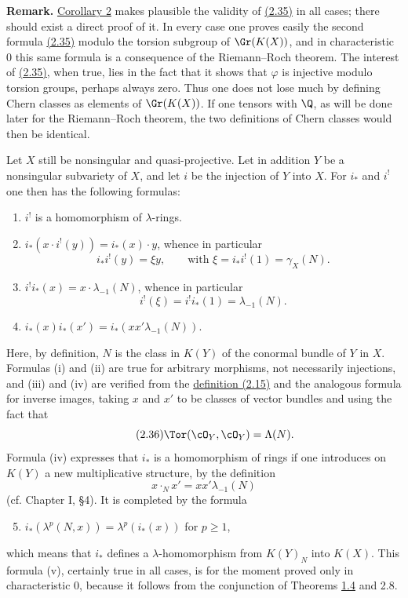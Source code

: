 \textbf{Remark.} \hyperlink{sga6.e00.cor.2}{Corollary 2} makes plausible the validity of \hyperlink{sga6.e00.eq.2-35}{(2.35)} in all cases; there should exist a direct proof of it. In every case one proves easily the second formula \hyperlink{sga6.e00.eq.2-35}{(2.35)} modulo the torsion subgroup of $\Gr(K(X))$, and in characteristic $0$ this same formula is a consequence of the Riemann--Roch theorem. The interest of \hyperlink{sga6.e00.eq.2-35}{(2.35)}, when true, lies in the fact that it shows that $\varphi$ is injective modulo torsion groups, perhaps always zero. Thus one does not lose much by defining Chern classes as elements of $\Gr(K(X))$. If one tensors with $\Q$, as will be done later for the Riemann--Roch theorem, the two definitions of Chern classes would then be identical.

Let $X$ still be nonsingular and quasi-projective. Let in addition $Y$ be a nonsingular subvariety of $X$, and let $i$ be the injection of $Y$ into $X$. For $i_*$ and $i^!$ one then has the following formulas:
\begin{enumerate}[label=(\roman*)]
\item $i^!$ is a homomorphism of $\lambda$-rings.
\item $i_*(x\cdot i^!(y))=i_*(x)\cdot y$, whence in particular
\[
 i_*i^!(y)=\xi y,
\qquad \text{with }\xi=i_*i^!(1)=\gamma_X(N).
\]
\item $i^!i_*(x)=x\cdot\lambda_{-1}(N)$, whence in particular
\[
 i^!(\xi)=i^!i_*(1)=\lambda_{-1}(N).
\]
\item $i_*(x)i_*(x')=i_*(xx'\lambda_{-1}(N))$.
\end{enumerate}
Here, by definition, $N$ is the class in $K(Y)$ of the conormal bundle of $Y$ in $X$. Formulas (i) and (ii) are true for arbitrary morphisms, not necessarily injections, and (iii) and (iv) are verified from the \hyperlink{sga6.e00.eq.2-15}{definition (2.15)} and the analogous formula for inverse images, taking $x$ and $x'$ to be classes of vector bundles and using the fact that
\begin{equation}\tag{2.36}
 \Tor(\cO_Y,\cO_Y)=\Lambda(N).
\end{equation}
Formula (iv) expresses that $i_*$ is a homomorphism of rings if one introduces on $K(Y)$ a new multiplicative structure, by the definition
\[
 x\cdot_N x'=xx'\lambda_{-1}(N)
\]
(cf. Chapter I, \S 4). It is completed by the formula
\begin{enumerate}[label=(\roman*)]
\setcounter{enumi}{4}
\item $i_*(\lambda^p(N,x))=\lambda^p(i_*(x))$ for $p\geq 1$,
\end{enumerate}
which means that $i_*$ defines a $\lambda$-homomorphism from $K(Y)_N$ into $K(X)$. This formula (v), certainly true in all cases, is for the moment proved only in characteristic $0$, because it follows from the conjunction of Theorems \hyperlink{sga6.e00.thm.1-4}{1.4} and 2.8.

